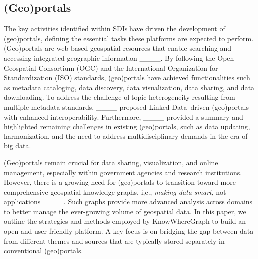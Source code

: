 \subsection{(Geo)portals}
\label{ssec:gp}
The key activities identified within SDIs have driven the development of (geo)portals, defining the essential tasks these platforms are expected to perform. (Geo)portals are web-based geospatial resources that enable searching and accessing integrated geographic information ____. By following the Open Geospatial Consortium (OGC) and the International Organization for Standardization (ISO) standards, (geo)portals have achieved functionalities such as metadata cataloging, data discovery, data visualization, data sharing, and data downloading. To address the challenge of topic heterogeneity resulting from multiple metadata standards, ____ proposed Linked Data--driven (geo)portals with enhanced interoperability. Furthermore, ____ provided a summary and highlighted remaining challenges in existing (geo)portals, such as data updating, harmonization, and the need to address multidisciplinary demands in the era of big data.

(Geo)portals remain crucial for data sharing, visualization, and online management, especially within government agencies and research institutions. However, there is a growing need for (geo)portals to transition toward more comprehensive geospatial knowledge graphs, i,e., \textit{making data smart}, not applications ____. Such graphs provide more advanced analysis across domains to better manage the ever-growing volume of geospatial data. In this paper, we outline the strategies and methods employed by KnowWhereGraph to build an open and user-friendly platform. A key focus is on bridging the gap between data from different themes and sources that are typically stored separately in conventional (geo)portals.

